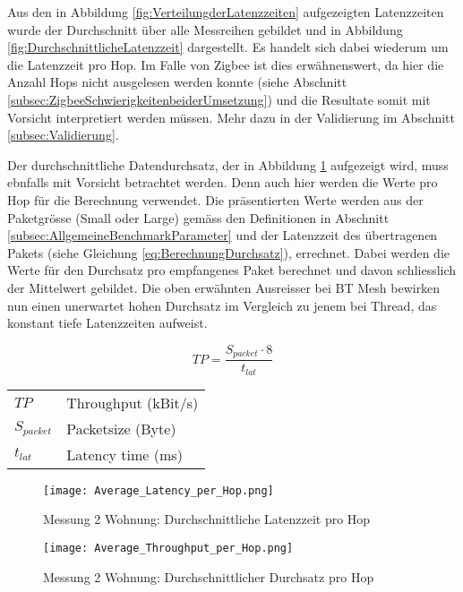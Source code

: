 Aus den in Abbildung \ref{fig:VerteilungderLatenzzeiten} aufgezeigten Latenzzeiten wurde der Durchschnitt über alle Messreihen gebildet und in Abbildung \ref{fig:DurchschnittlicheLatenzzeit} dargestellt.
Es handelt sich dabei wiederum um die Latenzzeit pro Hop. Im Falle von Zigbee ist dies erwähnenswert, da hier die Anzahl Hops nicht ausgelesen werden konnte (siehe Abschnitt \ref{subsec:ZigbeeSchwierigkeitenbeiderUmsetzung}) und die Resultate somit mit Vorsicht interpretiert werden müssen. Mehr dazu in der Validierung im Abschnitt \ref{subsec:Validierung}.

Der durchschnittliche Datendurchsatz, der in Abbildung \ref{fig:DurchschnittlicherDurchsatz} aufgezeigt wird, muss ebnfalls mit Vorsicht betrachtet werden. Denn auch hier werden die Werte pro Hop für die Berechnung verwendet.
Die präsentierten Werte werden aus der Paketgrösse (Small oder Large) gemäss den Definitionen in Abschnitt \ref{subsec:AllgemeineBenchmarkParameter} und der Latenzzeit des übertragenen Pakets (siehe Gleichung \ref{eq:BerechnungDurchsatz}), errechnet.
Dabei werden die Werte für den Durchsatz pro empfangenes Paket berechnet und davon schliesslich der Mittelwert gebildet.
Die oben erwähnten Ausreisser bei BT Mesh bewirken nun einen unerwartet hohen Durchsatz im Vergleich zu jenem bei Thread, das konstant tiefe Latenzzeiten aufweist.

\begin{equation}\label{eq:BerechnungDurchsatz}
TP =  \frac{S_{packet} \cdot 8}{t_{lat}}
\end{equation}

\begin{small}
\begin{center}
\begin{tabular}{ll}
$TP$ & Throughput (kBit/s)\\
$S_{packet}$ & Packetsize (Byte)\\
$t_{lat}$ & Latency time (ms)\\
\end{tabular}
\end{center}
\end{small}

\begin{figure}[!htbp]
\centering
\begin{minipage}[b]{0.49\textwidth}
		\centering
		\texttt{[image: Average\_Latency\_per\_Hop.png]}
		\caption{Messung 2 Wohnung: Durchschnittliche Latenzzeit pro Hop}
		\label{fig:DurchschnittlicheLatenzzeit}
\end{minipage}
\begin{minipage}[b]{0.49\textwidth}
		\centering
		\texttt{[image: Average\_Throughput\_per\_Hop.png]}
		\caption{Messung 2 Wohnung: Durchschnittlicher Durchsatz pro Hop}
		\label{fig:DurchschnittlicherDurchsatz}
\end{minipage}
\end{figure}


